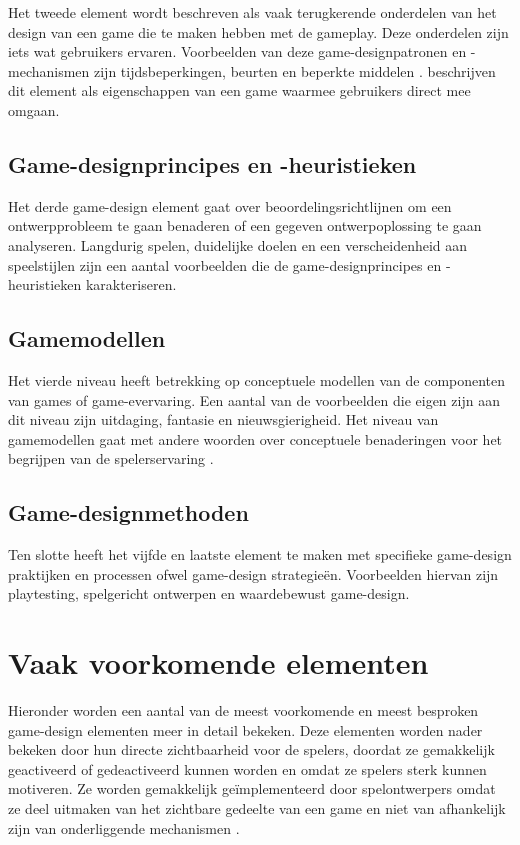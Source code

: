 Het tweede element wordt beschreven als vaak terugkerende onderdelen van het design van een game die te maken hebben met de gameplay. Deze onderdelen zijn iets wat gebruikers ervaren. Voorbeelden van deze game-designpatronen en -mechanismen zijn tijdsbeperkingen, beurten en beperkte middelen \autocite{Lindholm2016}. \textcite{Morford2014} beschrijven dit element als eigenschappen van een game waarmee gebruikers direct mee omgaan.

\subsection{Game-designprincipes en -heuristieken}

Het derde game-design element gaat over beoordelingsrichtlijnen om een ontwerpprobleem te gaan benaderen of een gegeven ontwerpoplossing te gaan analyseren. Langdurig spelen, duidelijke doelen en een verscheidenheid aan speelstijlen zijn een aantal voorbeelden die de game-designprincipes en -heuristieken karakteriseren.

\subsection{Gamemodellen}

Het vierde niveau heeft betrekking op conceptuele modellen van de componenten van games of game-evervaring. Een aantal van de voorbeelden die eigen zijn aan dit niveau zijn uitdaging, fantasie en nieuwsgierigheid. Het niveau van gamemodellen gaat met andere woorden over conceptuele benaderingen voor het begrijpen van de spelerservaring \autocite{Lindholm2016}.

\subsection{Game-designmethoden}

Ten slotte heeft het vijfde en laatste element te maken met specifieke game-design praktijken en processen ofwel game-design strategieën. Voorbeelden hiervan zijn playtesting, spelgericht ontwerpen en waardebewust game-design.

\section{Vaak voorkomende elementen}

Hieronder worden een aantal van de meest voorkomende en meest besproken game-design elementen meer in detail bekeken. Deze elementen worden nader bekeken door hun directe zichtbaarheid voor de spelers, doordat ze gemakkelijk geactiveerd of gedeactiveerd kunnen worden en omdat ze spelers sterk kunnen motiveren. Ze worden gemakkelijk geïmplementeerd door spelontwerpers omdat ze deel uitmaken van het zichtbare gedeelte van een game en niet van afhankelijk zijn van onderliggende mechanismen \autocite{Sailer2016}.

